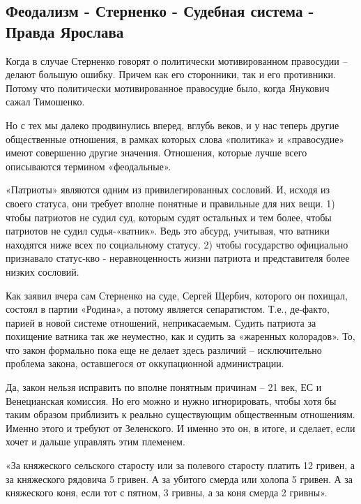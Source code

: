  
 
 
 
 

\subsection{Феодализм - Стерненко - Судебная система - Правда Ярослава}

Когда в случае Стерненко говорят о политически мотивированном правосудии –
делают большую ошибку. Причем как его сторонники, так и его противники. Потому
что политически мотивированное правосудие было, когда Янукович сажал Тимошенко.

Но с тех мы далеко продвинулись вперед, вглубь веков, и у нас теперь другие
общественные отношения, в рамках которых слова «политика» и «правосудие» имеют
совершенно другие значения. Отношения, которые лучше всего описываются термином
«феодальные».

«Патриоты» являются одним из привилегированных сословий. И, исходя из своего
статуса, они требует вполне понятные и правильные для них вещи. 1) чтобы
патриотов не судил суд, которым судят остальных и тем более, чтобы патриотов не
судил судья-«ватник». Ведь это абсурд, учитывая, что ватники находятся ниже
всех по социальному статусу.  2) чтобы государство официально признавало
статус-кво - неравноценность жизни патриота и представителя более низких
сословий.

Как заявил вчера сам Стерненко на суде, Сергей Щербич, которого он похищал,
состоял в партии «Родина», а потому является сепаратистом. Т.е., де-факто,
парией в новой системе отношений, неприкасаемым. Судить патриота за похищение
ватника так же неуместно, как и судить за «жаренных колорадов». То, что закон
формально пока еще не делает здесь различий – исключительно проблема закона,
оставшегося от оккупационной администрации.

Да, закон нельзя исправить по вполне понятным причинам – 21 век, ЕС и
Венецианская комиссия. Но его можно и нужно игнорировать, чтобы хотя бы таким
образом приблизить к реально существующим общественным отношениям. Именно этого
и требуют от Зеленского. И именно это он, в итоге, и сделает, если хочет и
дальше управлять этим племенем.

«За княжеского сельского старосту или за полевого старосту платить 12 гривен, а
за княжеского рядовича 5 гривен. А за убитого смерда или холопа 5 гривен. А за
княжеского коня, если тот с пятном, 3 гривны, а за коня смерда 2 гривны».
